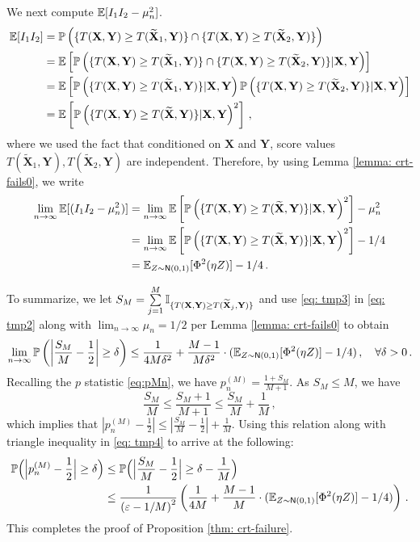 \documentclass[11pt]{article}
\def\bX{\mathbf{X}}
\def\bY{\mathbf{Y}}
\def\normal{\mathsf{N}}
\def\tbX{\widetilde{\bX}}
\begin{document}
We next compute ${\mathbb E}[I_1I_2-\mu_n^2]$.  
\begin{align*}
\E[ I_1I_2]&=\prob\left( \{T(\bX,\bY)\geq T(\tbX_1,\bY)\} \cap \{T(\bX,\bY)\geq T(\tbX_2,\bY) \}  \right)\nonumber \\
&=\E\left[\prob\left( \{T(\bX,\bY)\geq T(\tbX_1,\bY)\} \cap \{T(\bX,\bY)\geq T(\tbX_2,\bY) \}  | \bX,\bY \right)\right]\nonumber \\
&=\E \left[\prob\left( \{T(\bX,\bY)\geq T(\tbX_1,\bY)\}|\bX,\bY \right) \prob\left(\{T(\bX,\bY)\geq T(\tbX_2,\bY) \}  | \bX,\bY \right)\right] \nonumber \\
&=\E \left[\prob\left( \{T(\bX,\bY)\geq T(\tbX,\bY)\}|\bX,\bY \right)^2 \right]\,,
\end{align*}
where we used the fact that conditioned on $\bX$ and $\bY$, score values $T(\tbX_1,\bY), T(\tbX_2,\bY)$ are independent. Therefore, by using Lemma \ref{lemma: crt-fails0}, we write
% 
\begin{align}
\lim\limits_{n\rightarrow \infty}^{}\E[ (I_1 I_2-\mu_n^2)]&= \lim\limits_{n\rightarrow \infty}^{}\E \left[\prob\left( \{T(\bX,\bY)\geq T(\tbX,\bY)\}|\bX,\bY \right)^2 \right]-\mu_n^2 \nonumber\\
&= \lim\limits_{n\rightarrow \infty}^{}\E \left[\prob\left( \{T(\bX,\bY)\geq T(\tbX,\bY)\}|\bX,\bY \right)^2 \right]-1/4\nonumber \\
&=\E_{Z\sim\normal(0,1)}[ \Phi^2(\eta Z) ]-1/4  \,.\label{eq: tmp3}
\end{align}

To summarize, we let $S_M=\sum\limits_{j=1}^{M}  \ind_{\{ T(\bX,\bY)\geq T(\tbX_j,\bY) \} }$ and use \eqref{eq: tmp3} in \eqref{eq: tmp2} along with $\lim_{n\to\infty}\mu_n = 1/2$ per Lemma \ref{lemma: crt-fails0} to obtain
%
\begin{equation}\label{eq: tmp4}
\lim\limits_{n\rightarrow \infty}^{}\prob\left(\left|  \frac{S_M}{M}  -\frac{1}{2} \right| \geq \delta \right) \leq  \frac{1}{4M\delta^2} + \frac{M-1}{M\delta^2} \cdot(\E_{Z\sim\normal(0,1)}[\Phi^2(\eta Z)] -1/4)\,,\quad \forall \delta>0 \,.
\end{equation}
Recalling the $p$ statistic \eqref{eq:pMn}, we have $p^{(M)}_n=\frac {1+S_M}{M+1}$. As $S_M\leq M$, we have
\[
\frac{S_M}{M} \leq \frac{S_M+1}{M+1} \leq \frac{S_M}{M}+\frac{1}{M}\,,
\]
which implies that $\left|p^{(M)}_n-\frac{1}{2}\right| \leq \left| \frac{S_M}{M}-\frac{1}{2} \right|+\frac{1}{M}$. Using this relation along with triangle inequality in \eqref{eq: tmp4} to arrive at the following:
%
\begin{align*}
\prob\Big(\Big|p^{(M)}_n-\frac{1}{2}\Big|\geq \delta\Big) &\leq \prob\Big(\Big|\frac{S_M}{M}-\frac{1}{2}\Big|\geq \delta-\frac{1}{M}\Big)\\
&\leq \frac{1}{\left( \eps-1/M\right)^2} \left(   \frac{1}{4M} + \frac{M-1}{M} \cdot(\E_{Z\sim\normal(0,1)}[\Phi^2(\eta Z)] -1/4)  \right)\,.
\end{align*}
This completes the proof of Proposition \ref{thm: crt-failure}.
\end{document}
